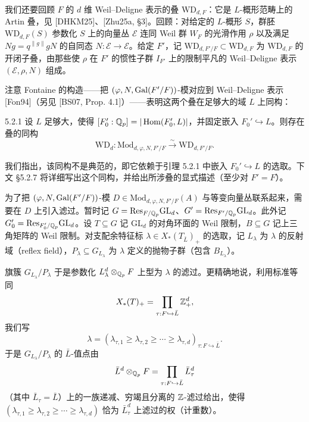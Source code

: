 我们还要回顾 $F$ 的 $d$ 维 Weil--Deligne 表示的叠 $\mathrm{WD}_{d,F}$：它是 $L$-概形范畴上的 Artin 叠，见 [DHKM25]、[Zhu25a, §3]。回顾：对给定的 $L$-概形 $S$，群胚 $\mathrm{WD}_{d,F}(S)$ 参数化 $S$ 上的向量丛 $\mathcal{E}$ 连同 Weil 群 $W_F$ 的光滑作用 $\rho$ 以及满足 $Ng=q^{\|g\|}gN$ 的自同态 $N:\mathcal{E}\to\mathcal{E}$。给定 $F'$，记 $\mathrm{WD}_{d,F'/F}\subset\mathrm{WD}_{d,F}$ 为 $\mathrm{WD}_{d,F}$ 的开闭子叠，由那些使 $\rho$ 在 $F'$ 的惯性子群 $I_{F'}$ 上的限制平凡的 Weil--Deligne 表示 $(\mathcal{E},\rho,N)$ 组成。

注意 Fontaine 的构造——把 $(\varphi,N,\operatorname{Gal}(F'/F))$-模对应到 Weil--Deligne 表示 [Fon94]（另见 [BS07, Prop. 4.1]）——表明这两个叠在足够大的域 $L$ 上同构：

\begin{lem}{5.2.1}
设 $L$ 足够大，使得 $[F_0':\mathbb{Q}_p]=|\operatorname{Hom}(F_0',L)|$，并固定嵌入 $F_0'\hookrightarrow L$。则存在叠的同构
\[
\mathrm{WD}_d: \mathrm{Mod}_{d,\varphi,N,F'/F}\xrightarrow{\ \sim\ }\mathrm{WD}_{d,F'/F}.
\]
\label{thm:a4-5-2-1}
\end{lem}

我们指出，该同构不是典范的，即它依赖于引理 5.2.1 中嵌入 $F_0'\hookrightarrow L$ 的选取。下文 §5.2.7 将详细写出这个同构，并给出所涉叠的显式描述（至少对 $F'=F$）。

为了把 $(\varphi,N,\operatorname{Gal}(F'/F))$-模 $D\in\mathrm{Mod}_{d,\varphi,N,F'/F}(A)$ 与等变向量丛联系起来，需要在 $D$ 上引入滤过。暂时记 $G=\mathrm{Res}_{F/\mathbb{Q}_p}\mathrm{GL}_d$、$G'=\mathrm{Res}_{F'/\mathbb{Q}_p}\mathrm{GL}_d$。此外记 $G_0'=\mathrm{Res}_{F_0'/\mathbb{Q}_p}\mathrm{GL}_d$。设 $T\subseteq G$ 记 $\mathrm{GL}_d$ 的对角环面的 Weil 限制，$B\subseteq G$ 记上三角矩阵的 Weil 限制。对支配余特征标 $\lambda\in X_*(T_{\bar L})_+$ 的选取，记 $L_\lambda$ 为 $\lambda$ 的反射域（reflex field），$P_\lambda\subseteq G_{L_\lambda}$ 为 $\lambda$ 定义的抛物子群（包含 $B_{L_\lambda}$）。

旗簇 $G_{L_\lambda}/P_\lambda$ 于是参数化 $L_\lambda^d\otimes_{\mathbb{Q}_p}F$ 上型为 $\lambda$ 的滤过。更精确地说，利用标准等同
\[
X_*(T)_+=\prod_{\tau:F\hookrightarrow\bar L}\mathbb{Z}^d_+,
\]
我们写
\[
\lambda=(\lambda_{\tau,1}\ge\lambda_{\tau,2}\ge\cdots\ge\lambda_{\tau,d})_{\tau:F\hookrightarrow\bar L}.
\]
于是 $G_{L_\lambda}/P_\lambda$ 的 $\bar L$-值点由
\[
\bar L^d\otimes_{\mathbb{Q}_p}F=\prod_{\tau:F\hookrightarrow\bar L}\bar L^d_\tau
\]
（其中 $\bar L_\tau=\bar L$）上的一族递减、穷竭且分离的 $\mathbb{Z}$-滤过给出，使得 $(\lambda_{\tau,1}\ge\lambda_{\tau,2}\ge\cdots\ge\lambda_{\tau,d})$ 恰为 $\bar L^d_\tau$ 上滤过的权（计重数）。

